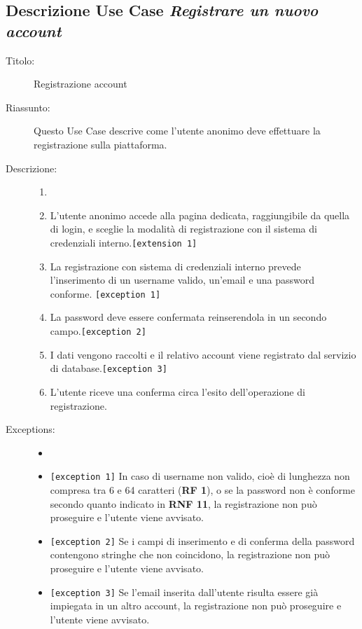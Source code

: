 \documentclass[11pt, a4paper]{article}
\theoremstyle{definition} %
\begin{document}
\subsection*{Descrizione Use Case \textit{Registrare un nuovo account}}
\begin{description}
    \item[Titolo:] Registrazione account
    
    \item[Riassunto:] Questo Use Case descrive come l'utente anonimo deve
    effettuare la registrazione sulla piattaforma.

    \item[Descrizione:]
    \begin{enumerate}
        \item[]
        \item L'utente anonimo accede alla pagina dedicata, raggiungibile da quella di login, e sceglie la modalità di registrazione con il sistema di credenziali interno.\texttt{[extension 1]}
        \item La registrazione con sistema di credenziali interno prevede l'inserimento di un username valido, un'email e una password conforme. \texttt{[exception 1]}
        \item La password deve essere confermata reinserendola in un secondo campo.\texttt{[exception 2]}
        \item I dati vengono raccolti e il relativo account viene registrato dal servizio di database.\texttt{[exception 3]}
        \item L'utente riceve una conferma circa l'esito dell'operazione di registrazione.
    \end{enumerate}
    
    \item[Exceptions:]
    \begin{itemize}
        \item[]
        \item \texttt{[exception 1]} In caso di username non valido, cioè di lunghezza non compresa tra 6 e 64 caratteri (\textbf{RF 1}), o se la password non è conforme secondo quanto indicato in \textbf{RNF 11}, la registrazione non può proseguire e l'utente viene avvisato.
        \item \texttt{[exception 2]} Se i campi di inserimento e di conferma della password contengono stringhe che non coincidono, la registrazione non può proseguire e l'utente viene avvisato.
        \item \texttt{[exception 3]} Se l'email inserita dall'utente risulta essere già impiegata in un altro account, la registrazione non può proseguire e l'utente viene avvisato.
    \end{itemize}


\end{description}
\end{document}
